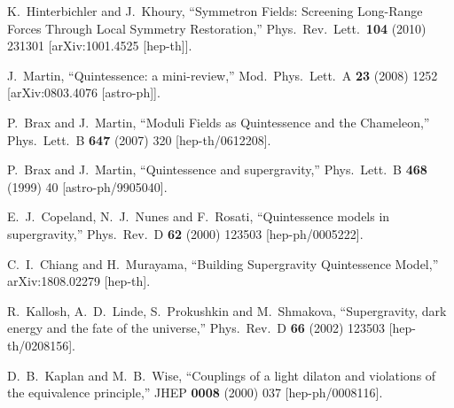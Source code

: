 \documentclass[11pt,a4paper]{article}
\begin{document}
\begin{thebibliography}{99}
  K.~Hinterbichler and J.~Khoury,
  ``Symmetron Fields: Screening Long-Range Forces Through Local Symmetry Restoration,''
  Phys.\ Rev.\ Lett.\  {\bf 104} (2010) 231301
  [arXiv:1001.4525 [hep-th]].


  J.~Martin,
  ``Quintessence: a mini-review,''
  Mod.\ Phys.\ Lett.\ A {\bf 23} (2008) 1252
  [arXiv:0803.4076 [astro-ph]].


  P.~Brax and J.~Martin,
  ``Moduli Fields as Quintessence and the Chameleon,''
  Phys.\ Lett.\ B {\bf 647} (2007) 320
  [hep-th/0612208].


  P.~Brax and J.~Martin,
  ``Quintessence and supergravity,''
  Phys.\ Lett.\ B {\bf 468} (1999) 40
  [astro-ph/9905040].


  E.~J.~Copeland, N.~J.~Nunes and F.~Rosati,
  ``Quintessence models in supergravity,''
  Phys.\ Rev.\ D {\bf 62} (2000) 123503
  [hep-ph/0005222].


  C.~I.~Chiang and H.~Murayama,
  ``Building Supergravity Quintessence Model,''
  arXiv:1808.02279 [hep-th].


  R.~Kallosh, A.~D.~Linde, S.~Prokushkin and M.~Shmakova,
  ``Supergravity, dark energy and the fate of the universe,''
  Phys.\ Rev.\ D {\bf 66} (2002) 123503
  [hep-th/0208156].

  D.~B.~Kaplan and M.~B.~Wise,
  ``Couplings of a light dilaton and violations of the equivalence principle,''
  JHEP {\bf 0008} (2000) 037
  [hep-ph/0008116].


\end{thebibliography}
\end{document}
